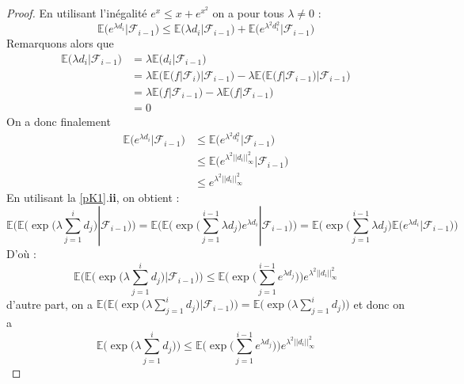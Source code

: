 \documentclass[12pt]{article}
\theoremstyle{definition}
\begin{document}
\begin{proof}
	En utilisant l'inégalité $e^x\leq x+e^{x^2}$ on a pour tous $\lambda\neq 0$ :
	\begin{equation*}
		\mathbb{E}\big(e^{\lambda d_i}|\mathcal{F}_{i-1}\big)\leq\mathbb{E}\big(\lambda d_i|\mathcal{F}_{i-1}\big)+\mathbb{E}\big(e^{\lambda^2 d_i^2}|\mathcal{F}_{i-1}\big)
	\end{equation*}
	Remarquons alors que 
	\begin{align*}
		\mathbb{E}\big(\lambda d_i|\mathcal{F}_{i-1}\big)&=\lambda \mathbb{E}\big( d_i|\mathcal{F}_{i-1}\big)\\
		&=\lambda\mathbb{E}\big( \mathbb{E}(f|\mathcal{F}_{i})|\mathcal{F}_{i-1}\big)-\lambda\mathbb{E}\big(\mathbb{E}(f|\mathcal{F}_{i-1})|\mathcal{F}_{i-1}\big)\\
		&=\lambda\mathbb{E}\big( f|\mathcal{F}_{i-1}\big)-\lambda\mathbb{E}\big(f|\mathcal{F}_{i-1}\big)\\
		&=0
	\end{align*}
	On a donc finalement 
	\begin{align*}
		\mathbb{E}\big(e^{\lambda d_i}|\mathcal{F}_{i-1}\big)&\leq\mathbb{E}\big(e^{\lambda^2 d_i^2}|\mathcal{F}_{i-1}\big)\\
		&\leq \mathbb{E}\big(e^{\lambda^2 ||d_i||_{\infty}^2}|\mathcal{F}_{i-1}\big)\\
		&\leq e^{\lambda^2 ||d_i||_{\infty}^2}
	\end{align*}
	En utilisant la \cref{pK1}.\textbf{ii}, on obtient :
	\begin{equation*}
		\mathbb{E}\Bigg(\mathbb{E}\Big(\exp\big(\lambda\sum_{j=1}^{i}d_j\big)|\mathcal{F}_{i-1}\Big)\Bigg)= 
		\mathbb{E}\Bigg(\mathbb{E}\Big(\exp\big(\sum_{j=1}^{i-1}\lambda d_j\big)e^{\lambda d_i}|\mathcal{F}_{i-1}\Big)\Bigg)= 
		\mathbb{E}\Bigg(\exp\big(\sum_{j=1}^{i-1}\lambda d_j\big)\mathbb{E}\big(e^{\lambda d_i}|\mathcal{F}_{i-1}\big)\Bigg)
	\end{equation*}
	D'où :
	\begin{equation*}
		\mathbb{E}\Bigg(\mathbb{E}\Big(\exp\big(\lambda\sum_{j=1}^{i}d_j\big)|\mathcal{F}_{i-1}\Big)\Bigg)\leq \mathbb{E}\Bigg(\exp\big(\sum_{j=1}^{i-1}e^{\lambda d_j}\big)\Bigg)e^{\lambda^2 ||d_i||_{\infty}^2}
	\end{equation*}
	d'autre part, on a $\mathbb{E}\Bigg(\mathbb{E}\Big(\exp\big(\lambda\sum_{j=1}^{i}d_j\big)|\mathcal{F}_{i-1}\Big)\Bigg)=\mathbb{E}\Big(\exp\big(\lambda\sum_{j=1}^{i}d_j\big)\Big)$
	et donc on a 
	\begin{equation*}
		\mathbb{E}\Big(\exp\big(\lambda\sum_{j=1}^{i}d_j\big)\Big)\leq \mathbb{E}\Bigg(\exp\big(\sum_{j=1}^{i-1}e^{\lambda d_j}\big)\Bigg)e^{\lambda^2 ||d_i||_{\infty}^2}

\end{equation*}
\end{proof}
\end{document}
